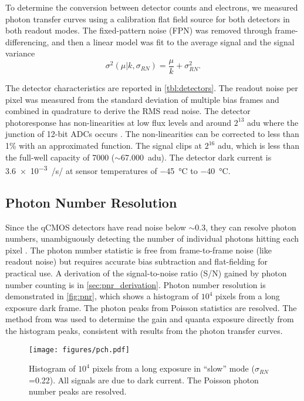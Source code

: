 To determine the conversion between detector counts and electrons, we measured photon transfer curves using a calibration flat field source for both detectors in both readout modes. The fixed-pattern noise (FPN) was removed through frame-differencing, and then a linear model was fit to the average signal and the signal variance \citep{janesick_photon_2007,stefanov_cmos_2022}
\begin{equation}
    \sigma^2\left(\mu | k, \sigma_{RN}\right) = \frac{\mu}{k} + \sigma^2_{RN}.
\end{equation}

The detector characteristics are reported in \autoref{tbl:detectors}. The readout noise per pixel was measured from the standard deviation of multiple bias frames and combined in quadrature to derive the RMS read noise. The detector photoresponse has non-linearities at low flux levels and around $2^{13}$ adu where the junction of 12-bit ADCs occurs \citep[see][]{strakhov_speckle_2023}. The non-linearities can be corrected to less than 1\% with an approximated function. The signal clips at $2^{16}$ adu, which is less than the full-well capacity of \SI{7000}{\electron} ($\sim$\SI{67,000}{adu}). The detector dark current is \SI{3.6e-3}{\electron/\second/\pixel} at sensor temperatures of \SI{-45}{\celsius} to \SI{-40}{\celsius}.

\subsection{Photon Number Resolution}

Since the qCMOS detectors have read noise below $\sim$\SI{0.3}{\electron}, they can resolve photon numbers, unambiguously detecting the number of individual photons hitting each pixel  \citep{starkey_determining_2016}. The photon number statistic is free from frame-to-frame noise (like readout noise) but requires accurate bias subtraction and flat-fielding for practical use. A derivation of the signal-to-noise ratio (S/N) gained by photon number counting is in \autoref{sec:pnr_derivation}. Photon number resolution is demonstrated in \autoref{fig:pnr}, which shows a histogram of $10^4$ pixels from a long exposure dark frame. The photon peaks from Poisson statistics are resolved. The method from \citet{starkey_determining_2016} was used to determine the gain and quanta exposure directly from the histogram peaks, consistent with results from the photon transfer curves.

\begin{figure}
    \centering
    \texttt{[image: figures/pch.pdf]}
    \caption{Histogram of $10^4$ pixels from a long exposure in ``slow'' mode ($\sigma_{RN}$=\SI{0.22}{\electron}). All signals are due to dark current. The Poisson photon number peaks are resolved.\label{fig:pch}}
\end{figure}

